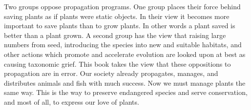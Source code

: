 Two groups oppose propagation programs. One group places their force
behind saving plants as if plants were static objects. In their view it becomes more
important to save plants than to grow plants. In other words a plant saved is better
than a plant grown. A second group has the view that raising large numbers from
seed, introducing the species into new and suitable habitats, and other actions which
promote and accelerate evolution are looked upon at best as causing taxonomic grief.
This book takes the view that these oppositions to propagation are in error. Our
society already propagates, manages, and distributes animals and fish with much
success. Now we must manage plants the same way. This is the way to preserve
endangered species and serve conservation, and most of all, to express our love of
plants.

